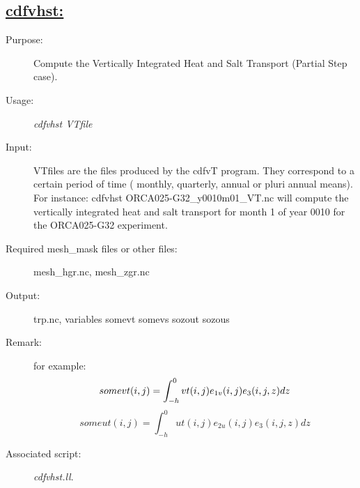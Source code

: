 \documentclass[a4paper,11pt]{article}
\begin{document}
\newpage
\subsection*{\underline{cdfvhst:}}
\begin{description}
\item[Purpose:] Compute the Vertically Integrated  Heat and Salt Transport (Partial Step case).
\item[Usage:] {\em cdfvhst VTfile }
\item[Input:] VTfiles are the files produced by the cdfvT program.
They correspond to a certain period of time ( monthly, quarterly, annual or
pluri annual means). 
For instance: cdfvhst ORCA025-G32\_y0010m01\_VT.nc
will compute the vertically integrated heat and salt transport for month 1 of year 0010 for the ORCA025-G32 experiment.
\item[Required mesh\_mask files or other files:]   mesh\_hgr.nc, mesh\_zgr.nc  \\
\item[Output:]trp.nc, variables somevt somevs sozout sozous 
\item[Remark:] for example:\\
\begin{equation}
somevt(i,j)=\int_{-h}^{0}{vt(i,j)e_{1v}(i,j) e_3(i,j,z) dz}  \\
\end{equation}
\begin{equation}
someut(i,j)=\int_{-h}^{0}{ut(i,j)e_{2u}(i,j) e_3(i,j,z) dz} 
\end{equation}
\item[Associated script:] {\em cdfvhst.ll}. 
\end{description}

\newpage
\end{document}
